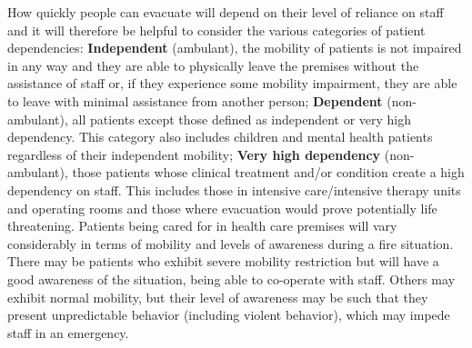 \documentclass{style/llncs}
\begin{document}
How quickly people can evacuate will depend on their level of reliance on
staff and it will therefore be helpful to consider the various categories
of patient dependencies: \textbf{Independent} (ambulant), the mobility of
patients is not impaired in any way and they are able to physically leave
the premises without the assistance of staff or, if they experience some
mobility impairment, they are able to leave with minimal assistance from
another person; \textbf{Dependent} (non-ambulant), all patients except those
defined as independent or very high dependency. This category also
includes children and mental health patients regardless of their
independent mobility; \textbf{Very high dependency} (non-ambulant), those
patients whose clinical treatment and/or condition create a high
dependency on staff. This includes those in intensive care/intensive
therapy units and operating rooms and those where evacuation would prove
potentially life threatening. Patients being cared for in health care
premises will vary considerably in terms of mobility and levels of
awareness during a fire situation. There may be patients who exhibit
severe mobility restriction but will have a good awareness of the
situation, being able to co-operate with staff. Others may exhibit normal
mobility, but their level of awareness may be such that they present
unpredictable behavior (including violent behavior), which may impede
staff in an emergency.%
\end{document}
